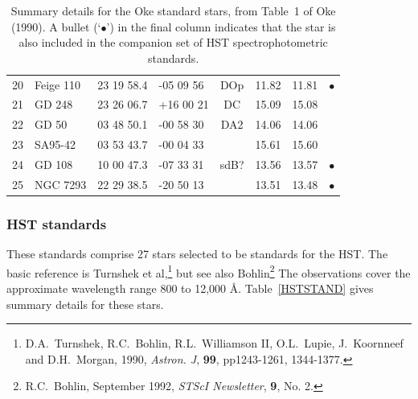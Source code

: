 \begin{table}[htbp]
\begin{center}
\begin{tabular}{clllcccc}
20 & Feige 110   & 23 19 58.4  & -05 09 56  & DOp  & 11.82  & 11.81 & $\bullet$ \\
21 & GD 248      & 23 26 06.7  & +16 00 21  & DC   & 15.09  & 15.08 & \\
22 & GD 50       & 03 48 50.1  & -00 58 30  & DA2  & 14.06  & 14.06 & \\
23 & SA95-42     & 03 53 43.7  & -00 04 33  &      & 15.61  & 15.60 & \\
24 & GD 108      & 10 00 47.3  & -07 33 31  & sdB? & 13.56  & 13.57 & $\bullet$ \\
25 & NGC 7293    & 22 29 38.5  & -20 50 13  &      & 13.51  & 13.48 & $\bullet$ \\
\end{tabular}
\end{center}

\begin{quote}
\caption{Summary details for the Oke standard stars, from Table~1 of Oke
(1990).  A bullet (`$\bullet$') in the final column indicates that the star
is also included in the companion set of HST spectrophotometric standards.
\label{OKESTAND} }
\end{quote}

\end{table}

\subsubsection{HST standards}

   These standards comprise 27 stars selected to be standards for the
   HST.  The basic reference is Turnshek et al,\footnote{D.A.~Turnshek,
   R.C.~Bohlin, R.L.~Williamson II, O.L.~Lupie, J.~Koornneef and
   D.H.~Morgan, 1990, {\it Astron. J}, {\bf 99}, pp1243-1261, 1344-1377.}
   but see also Bohlin\footnote{R.C.~Bohlin, September 1992, {\it STScI
   Newsletter}, {\bf 9}, No. 2.}  The observations cover the approximate
   wavelength range 800 to 12,000 \AA .  Table~\ref{HSTSTAND} gives
   summary details for these stars.

